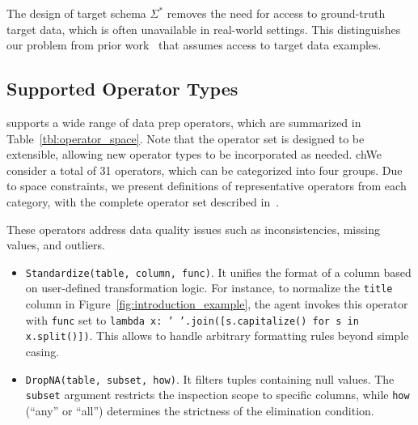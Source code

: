 The design of target schema $\Sigma^\ast$ removes the need for access to ground-truth target data, which is often unavailable in real-world settings. This distinguishes our problem from prior work~\cite{he2018transform, gulwani2012spreadsheet, jin2017foofah, singh2016blinkfill} that assumes access to target data examples.


\subsection{Supported Operator Types}
\label{subsec:operator_space}
\sys supports a wide range of data prep operators, which are summarized in Table~\ref{tbl:operator_space}. Note that the operator set is designed to be extensible, allowing new operator types to be incorporated as needed. 
chWe consider a total of 31 operators, which can be categorized into four groups. Due to space constraints, we present definitions of representative operators from each category, with the complete operator set described in~\cite{technical_report}.



\add{

}




 These operators address data quality issues such as inconsistencies, missing values, and outliers.
\begin{itemize}[leftmargin=1em]
    \item \texttt{Standardize(table, column, func)}. It unifies the format of a column based on user-defined transformation logic. For instance, to normalize the \texttt{title} column in Figure~\ref{fig:introduction_example}, the agent invokes this operator with \texttt{func} set to {\small\texttt{lambda x: ' '.join([s.capitalize() for s in x.split()])}}. This allows \sys to handle arbitrary formatting rules beyond simple casing.
    \item \texttt{DropNA(table, subset, how)}. It filters tuples containing null values. The \texttt{subset} argument restricts the inspection scope to specific columns, while \texttt{how} (``any'' or ``all'') determines the strictness of the elimination condition.
\end{itemize}

